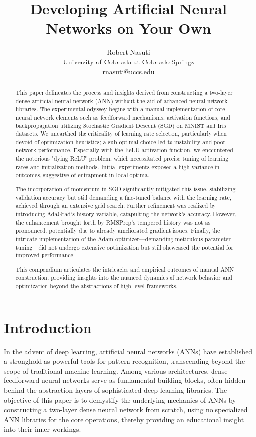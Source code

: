 \documentclass[letterpaper]{article}
\title{Developing Artificial Neural Networks on Your Own}
\author{Robert Nasuti\\
University of Colorado at Colorado Springs\\
rnasuti@uccs.edu}
\begin{document}
\maketitle

\begin{abstract}
This paper delineates the process and insights derived from constructing a two-layer dense artificial neural network (ANN) without the aid of advanced neural network libraries. The experimental odyssey begins with a manual implementation of core neural network elements such as feedforward mechanisms, activation functions, and backpropagation utilizing Stochastic Gradient Descent (SGD) on MNIST and Iris datasets. We unearthed the criticality of learning rate selection, particularly when devoid of optimization heuristics; a sub-optimal choice led to instability and poor network performance. Especially with the ReLU activation function, we encountered the notorious "dying ReLU" problem, which necessitated precise tuning of learning rates and initialization methods. Initial experiments exposed a high variance in outcomes, suggestive of entrapment in local optima.
    
The incorporation of momentum in SGD significantly mitigated this issue, stabilizing validation accuracy but still demanding a fine-tuned balance with the learning rate, achieved through an extensive grid search. Further refinement was realized by introducing AdaGrad's history variable, catapulting the network's accuracy. However, the enhancement brought forth by RMSProp's tempered history was not as pronounced, potentially due to already ameliorated gradient issues. Finally, the intricate implementation of the Adam optimizer—demanding meticulous parameter tuning—did not undergo extensive optimization but still showcased the potential for improved performance.
    
This compendium articulates the intricacies and empirical outcomes of manual ANN construction, providing insights into the nuanced dynamics of network behavior and optimization beyond the abstractions of high-level frameworks.
\end{abstract}
    

\section{Introduction}
\label{sec:introduction}

In the advent of deep learning, artificial neural networks (ANNs) have established a stronghold as powerful tools for pattern recognition, transcending beyond the scope of traditional machine learning. Among various architectures, dense feedforward neural networks serve as fundamental building blocks, often hidden behind the abstraction layers of sophisticated deep learning libraries. The objective of this paper is to demystify the underlying mechanics of ANNs by constructing a two-layer dense neural network from scratch, using no specialized ANN libraries for the core operations, thereby providing an educational insight into their inner workings.
\end{document}
